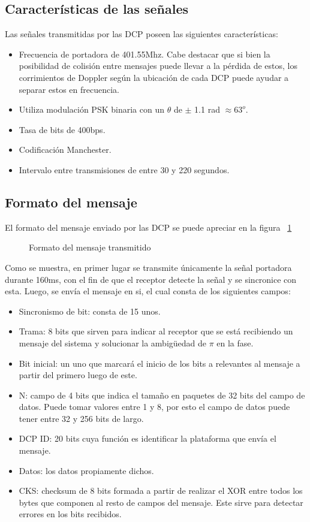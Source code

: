 \documentclass[a4paper,10pt]{article}
\begin{document}
\subsection{Características de las señales}
Las señales transmitidas por las DCP poseen las siguientes características:
\begin{itemize}
\item Frecuencia de portadora de 401.55Mhz. Cabe destacar que si bien la posibilidad de colisión entre mensajes puede llevar a la pérdida de estos, 
los corrimientos de Doppler según la ubicación de cada DCP puede ayudar a separar estos en frecuencia.
\item Utiliza modulación PSK binaria con un $\theta$ de $\pm $ 1.1 rad $ \approx 63^o$.
\item Tasa de bits de 400bps.
\item Codificación Manchester.
\item Intervalo entre transmisiones de entre 30 y 220 segundos.
\end{itemize}

\subsection{Formato del mensaje}
El formato del mensaje enviado por las DCP se puede apreciar en la figura ~\ref{formatoMensaje}

\begin{figure}[H]
\centering
{}
\caption{Formato del mensaje transmitido}
\label{formatoMensaje}
\end{figure}

Como se muestra, en primer lugar se transmite únicamente la señal portadora durante 160ms, con el fin de que el receptor detecte la señal y se sincronice con esta. Luego, se envía el mensaje en si, el cual consta de los siguientes campos:
\begin{itemize}
\item Sincronismo de bit: consta de 15 unos.
\item Trama: 8 bits que sirven para indicar al receptor que se está recibiendo un mensaje del sistema y solucionar la ambigüedad de $\pi$ en la fase.
\item Bit inicial: un uno que marcará el inicio de los bits a relevantes al mensaje a partir del primero luego de este.
\item N: campo de 4 bits que indica el tamaño en paquetes de 32 bits del campo de datos. Puede tomar valores entre 1 y 8, por esto el campo de datos puede tener entre 32 y 256 bits de largo.
\item DCP ID: 20 bits cuya función es identificar la plataforma que envía el mensaje.
\item Datos: los datos propiamente dichos.
\item CKS: checksum de 8 bits formada a partir de realizar el XOR entre todos los bytes que componen al resto de campos del mensaje. Este sirve para detectar errores en los bits recibidos.
\end{itemize}
\end{document}
